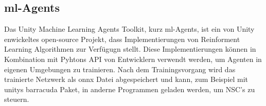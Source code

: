 \subsection{ml-Agents}
Das Unity Machine Learning Agents Toolkit, kurz ml-Agents, ist ein von Unity enwickeltes open-source Projekt, dass Implementierungen von Reinforment Learning Algorithmen zur Verfügugn stellt. 
Diese Implementierungen können in Kombination mit Pyhtons API von Entwicklern verwendt werden, um Agenten in eigenen Umgebungen zu trainieren.
Nach dem Trainingsvorgang wird das trainierte Netzwerk als onnx Datei abgespeichert und kann, zum Beispiel mit unitys barracuda Paket, in anderne Programmen geladen werden, um NSC's zu steuern.

